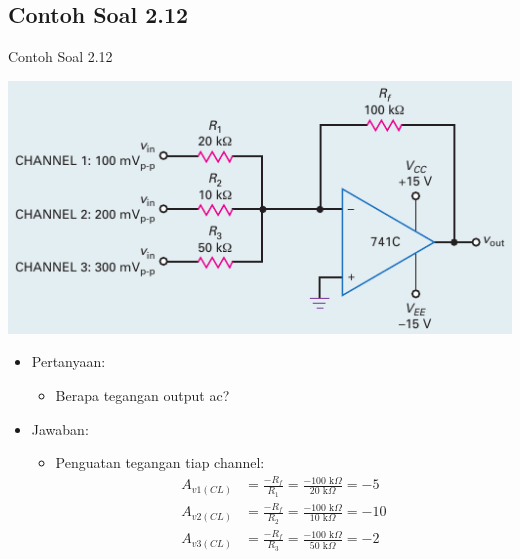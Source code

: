 \subsection{Contoh Soal 2.12}
\begin{frame}{Contoh Soal 2.12}
	\begin{multicols}{2}
		\begin{center}
			\includegraphics[width=\linewidth]{gambar/fig-16.25}
		\end{center}
		\columnbreak
		\begin{itemize}
			\item Pertanyaan:
			\begin{itemize}
				\item Berapa tegangan output ac?
			\end{itemize}
			\item Jawaban:
			\begin{itemize}
				\item Penguatan tegangan tiap channel:
				\begin{align*}
					A_{v1(CL)} &= \frac{-R_f}{R_1} = \frac{-100 \text{ k}\Omega}{20 \text{ k}\Omega} = -5 \\
					A_{v2(CL)} &= \frac{-R_f}{R_2} = \frac{-100 \text{ k}\Omega}{10 \text{ k}\Omega} = -10 \\
					A_{v3(CL)} &= \frac{-R_f}{R_3} = \frac{-100 \text{ k}\Omega}{50 \text{ k}\Omega} = -2 \\
				\end{align*}
			\end{itemize}
		\end{itemize}
	\end{multicols}
\end{frame}

